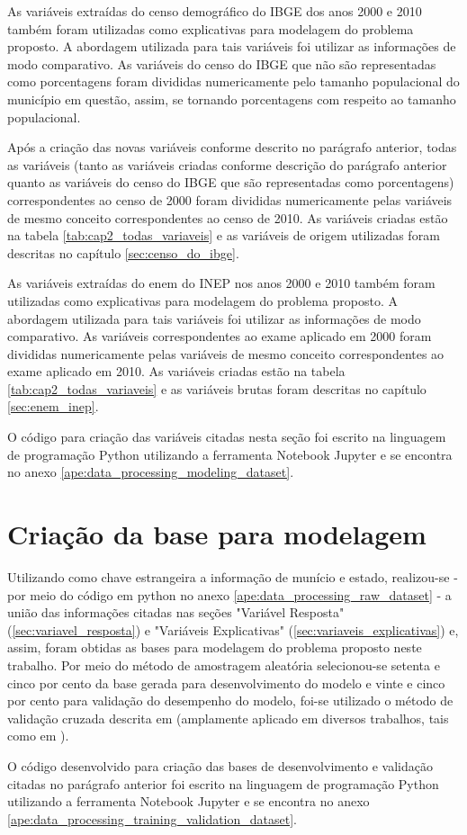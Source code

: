 As variáveis extraídas do censo demográfico do IBGE dos anos 2000 e 2010 também foram utilizadas como explicativas para modelagem do problema proposto. A abordagem utilizada para tais variáveis foi utilizar as informações de modo comparativo. As variáveis do censo do IBGE que não são representadas como porcentagens foram divididas numericamente pelo tamanho populacional do município em questão, assim, se tornando porcentagens com respeito ao tamanho populacional.

Após a criação das novas variáveis conforme descrito no parágrafo anterior, todas as variáveis (tanto as variáveis criadas conforme descrição do parágrafo anterior quanto as variáveis do censo do IBGE que são representadas como porcentagens) correspondentes ao censo de 2000 foram divididas numericamente pelas variáveis de mesmo conceito correspondentes ao censo de 2010. As variáveis criadas estão na tabela \ref{tab:cap2_todas_variaveis} e as variáveis de origem utilizadas foram descritas no capítulo \ref{sec:censo_do_ibge}.

As variáveis extraídas do enem do INEP nos anos 2000 e 2010 também foram utilizadas como explicativas para modelagem do problema proposto. A abordagem utilizada para tais variáveis foi utilizar as informações de modo comparativo. As variáveis correspondentes ao exame aplicado em 2000 foram divididas numericamente pelas variáveis de mesmo conceito correspondentes ao exame aplicado em 2010. As variáveis criadas estão na tabela \ref{tab:cap2_todas_variaveis} e as variáveis brutas foram descritas no capítulo \ref{sec:enem_inep}.

O código para criação das variáveis citadas nesta seção foi escrito na linguagem de programação Python utilizando a ferramenta Notebook Jupyter e se encontra no anexo \ref{ape:data_processing_modeling_dataset}.

\section{Criação da base para modelagem}
\label{sec:criacao_da_base_para_modelagem}

Utilizando como chave estrangeira a informação de munício e estado, realizou-se - por meio do código em python no anexo \ref{ape:data_processing_raw_dataset} - a união das informações citadas nas seções "Variável Resposta" (\ref{sec:variavel_resposta}) e "Variáveis Explicativas" (\ref{sec:variaveis_explicativas}) e, assim, foram obtidas as bases para modelagem do problema proposto neste trabalho. Por meio do método de amostragem aleatória selecionou-se setenta e cinco por cento da base gerada para desenvolvimento do modelo e vinte e cinco por cento para validação do desempenho do modelo, foi-se utilizado o método de validação cruzada descrita em \citet{Kohavi1995} (amplamente aplicado em diversos trabalhos, tais como em \citet{Wesllen2017:MSc}).

O código desenvolvido para criação das bases de desenvolvimento e validação citadas no parágrafo anterior foi escrito na linguagem de programação Python utilizando a ferramenta Notebook Jupyter e se encontra no anexo \ref{ape:data_processing_training_validation_dataset}.

